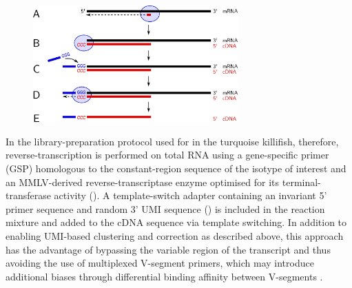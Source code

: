 \begin{figure}
\centering
\includegraphics[width=0.7\textwidth]{_Figures/png_edited/template-switch-labelled}
\vspace{0.5em}
\label{fig:template-switch-schema}
\end{figure}

In the library-preparation protocol used for \Igseq in the turquoise killifish, therefore, reverse-transcription is performed on total RNA using a gene-specific primer (GSP) homologous to the constant-region sequence of the isotype of interest and an MMLV-derived reverse-transcriptase enzyme optimised for its terminal-transferase activity (). A template-switch adapter containing an invariant 5' primer sequence and random 3' UMI sequence () is included in the reaction mixture and added to the cDNA sequence via template switching. In addition to enabling UMI-based clustering and correction as described above, this approach has the advantage of bypassing the variable region of the \igh{} transcript and thus avoiding the use of multiplexed V-segment primers, which may introduce additional biases through differential binding affinity between V-segments \parencite{rosati2017methods}.

